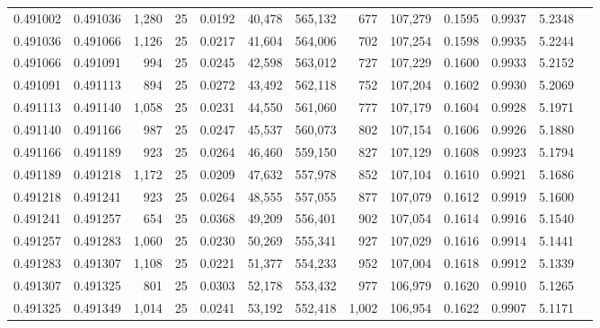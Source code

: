 \begin{tabular}{rrrrrrrrrrrrr}
0.491002 & 0.491036 & 1,280 &  25 &                                     0.0192 &  40,478 & 565,132 &     677 & 107,279 & 0.1595 & 0.9937 & 5.2348 \\
0.491036 & 0.491066 & 1,126 &  25 &                                     0.0217 &  41,604 & 564,006 &     702 & 107,254 & 0.1598 & 0.9935 & 5.2244 \\
0.491066 & 0.491091 &   994 &  25 &                                     0.0245 &  42,598 & 563,012 &     727 & 107,229 & 0.1600 & 0.9933 & 5.2152 \\
0.491091 & 0.491113 &   894 &  25 &                                     0.0272 &  43,492 & 562,118 &     752 & 107,204 & 0.1602 & 0.9930 & 5.2069 \\
0.491113 & 0.491140 & 1,058 &  25 &                                     0.0231 &  44,550 & 561,060 &     777 & 107,179 & 0.1604 & 0.9928 & 5.1971 \\
0.491140 & 0.491166 &   987 &  25 &                                     0.0247 &  45,537 & 560,073 &     802 & 107,154 & 0.1606 & 0.9926 & 5.1880 \\
0.491166 & 0.491189 &   923 &  25 &                                     0.0264 &  46,460 & 559,150 &     827 & 107,129 & 0.1608 & 0.9923 & 5.1794 \\
0.491189 & 0.491218 & 1,172 &  25 &                                     0.0209 &  47,632 & 557,978 &     852 & 107,104 & 0.1610 & 0.9921 & 5.1686 \\
0.491218 & 0.491241 &   923 &  25 &                                     0.0264 &  48,555 & 557,055 &     877 & 107,079 & 0.1612 & 0.9919 & 5.1600 \\
0.491241 & 0.491257 &   654 &  25 &                                     0.0368 &  49,209 & 556,401 &     902 & 107,054 & 0.1614 & 0.9916 & 5.1540 \\
0.491257 & 0.491283 & 1,060 &  25 &                                     0.0230 &  50,269 & 555,341 &     927 & 107,029 & 0.1616 & 0.9914 & 5.1441 \\
0.491283 & 0.491307 & 1,108 &  25 &                                     0.0221 &  51,377 & 554,233 &     952 & 107,004 & 0.1618 & 0.9912 & 5.1339 \\
0.491307 & 0.491325 &   801 &  25 &                                     0.0303 &  52,178 & 553,432 &     977 & 106,979 & 0.1620 & 0.9910 & 5.1265 \\
0.491325 & 0.491349 & 1,014 &  25 &                                     0.0241 &  53,192 & 552,418 &   1,002 & 106,954 & 0.1622 & 0.9907 & 5.1171 \\

\end{tabular}
